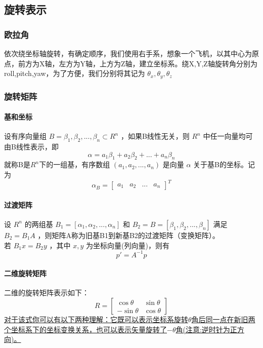 \documentclass{ctexart}
\begin{document}
	\subsection{旋转表示}
	\subsubsection{欧拉角}
	依次绕坐标轴旋转，有确定顺序，我们使用右手系，想象一个飞机，以其中心为原点，前方为X轴，左方为Y轴，上方为Z轴，建立坐标系。绕X,Y,Z轴旋转角分别为roll,pitch,yaw，为了方便，我们分别将其记为 $ \theta_x,\theta_y,\theta_z $
	\subsubsection{旋转矩阵}
	\paragraph{基和坐标}
	设有序向量组 $B={\beta_1,\beta_2,...,\beta_n} \subset R^n$ ，如果B线性无关，则 $R^n$ 中任一向量均可由B线性表示，即
	\begin{equation}
	\alpha=a_1 \beta_1 + a_2 \beta_2 + ... + a_n \beta_n
	\end{equation}
	就称B是$R^n$下的一组基，有序数组 $(a_1,a_2,...,a_n)$ 是向量 $\alpha$ 关于基B的坐标。记为
	\begin{equation}
	\alpha_B =
	\begin{bmatrix}
	a_1 & a_2 & ... & a_n
	\end{bmatrix}^T
	\end{equation}
	\paragraph{过渡矩阵}
	设 $R^n$ 的两组基 $B_1=[\alpha_1,\alpha_2,...,\alpha_n]$ 和 $B_2=B=[\beta_1,\beta_2,...,\beta_n]$ 满足 $B_2 = B_1 A$ ，则矩阵A称为旧基B1到新基B2的过渡矩阵（变换矩阵）。
	\\
	若 $B_1 x = B_2 y$ ，其中 $x,y$ 为坐标向量(列向量)，则有
	\begin{equation}
	p' = A^{-1} p
	\end{equation}
	\paragraph{二维旋转矩阵}
	二维的旋转矩阵表示如下：
	\begin{equation}
	R =
	\begin{bmatrix}
	\cos \theta & \sin \theta \\
	-\sin \theta & \cos \theta
	\end{bmatrix}
	\end{equation}
	\uline{对于该式你可以有以下两种理解：它既可以表示坐标系旋转$\theta$角后同一点在新旧两个坐标系下的坐标变换关系，也可以表示矢量旋转了$-\theta$角(注意:逆时针为正方向)。}
\end{document}
